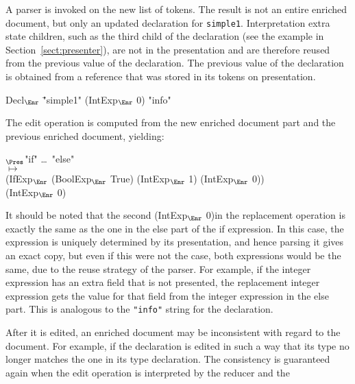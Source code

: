 A parser is invoked on the new list of tokens. The result is not an entire enriched document, but only an updated declaration for \verb|simple1|. Interpretation extra state children, such as the third child of the declaration (see the example in Section~\ref{sect:presenter}), are not in the presentation and are therefore reused from the previous value of the declaration. The previous value of the declaration is obtained from a reference that was stored in its tokens on presentation. 

\small \ttfamily
\begin{tabbing}
Decl$_{\Enr}$ \= "simple1" (IntExp$_{\Enr}$ 0) "info"
\end{tabbing}
\rmfamily \normalsize

The edit operation is computed from the new enriched document part and the previous enriched document, yielding:

\small \ttfamily
\begin{tabbing}
$_{\Pres}$\ttfamily  "if" \dots~"else"\\
$\mapsto$\\
  \ttfamily (IfExp$_{\Enr}$ (BoolExp$_{\Enr}$ True) (IntExp$_{\Enr}$ 1) (IntExp$_{\Enr}$ 0))\\
  \ttfamily (IntExp$_{\Enr}$ 0) 
\end{tabbing}
\rmfamily \normalsize

It should be noted that the second \ttfamily (IntExp$_{\Enr}$ 0)\rmfamily in the replacement operation is exactly the same as the one in the else part of the if expression. In this case, the expression is uniquely determined by its presentation, and hence parsing it gives an exact copy, but even if this were not the case, both expressions would be the same, due to the reuse strategy of the parser. For example, if the integer expression has an extra field that is not presented, the replacement integer expression gets the value for that field from the integer expression in the else part. This is analogous to the \verb|"info"| string for the declaration.


\bc
After it is edited, an enriched document may be inconsistent with regard to the document. For example, if the declaration is edited in such a way that its type no longer matches the one in its type declaration. The consistency is guaranteed again when the edit operation is interpreted by the reducer and the 
\ec

